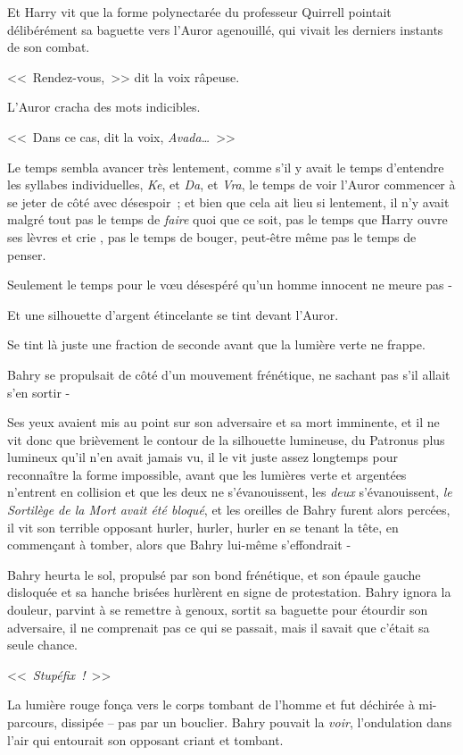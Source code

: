 Et Harry vit que la forme polynectarée du professeur Quirrell pointait délibérément sa baguette vers l'Auror agenouillé, qui vivait les derniers instants de son combat.

<<~Rendez-vous,~>> dit la voix râpeuse.

L'Auror cracha des mots indicibles.

<<~Dans ce cas, dit la voix, \emph{Avada…}~>>

Le temps sembla avancer très lentement, comme s'il y avait le temps d'entendre les syllabes individuelles, \emph{Ke}, et \emph{Da}, et \emph{Vra}, le temps de voir l'Auror commencer à se jeter de côté avec désespoir~; et bien que cela ait lieu si lentement, il n'y avait malgré tout pas le temps de \emph{faire} quoi que ce soit, pas le temps que Harry ouvre ses lèvres et crie , pas le temps de bouger, peut-être même pas le temps de penser.

Seulement le temps pour le vœu désespéré qu'un homme innocent ne meure pas -

Et une silhouette d'argent étincelante se tint devant l'Auror.

Se tint là juste une fraction de seconde avant que la lumière verte ne frappe.

\later

Bahry se propulsait de côté d'un mouvement frénétique, ne sachant pas s'il allait s'en sortir -

Ses yeux avaient mis au point sur son adversaire et sa mort imminente, et il ne vit donc que brièvement le contour de la silhouette lumineuse, du Patronus plus lumineux qu'il n'en avait jamais vu, il le vit juste assez longtemps pour reconnaître la forme impossible, avant que les lumières verte et argentées n'entrent en collision et que les deux ne s'évanouissent, les \emph{deux} s'évanouissent, \emph{le Sortilège de la Mort avait été bloqué}, et les oreilles de Bahry furent alors percées, il vit son terrible opposant hurler, hurler, hurler en se tenant la tête, en commençant à tomber, alors que Bahry lui-même s'effondrait -

Bahry heurta le sol, propulsé par son bond frénétique, et son épaule gauche disloquée et sa hanche brisées hurlèrent en signe de protestation. Bahry ignora la douleur, parvint à se remettre à genoux, sortit sa baguette pour étourdir son adversaire, il ne comprenait pas ce qui se passait, mais il savait que c'était sa seule chance.

<<~\emph{Stupéfix~!}~>>

La lumière rouge fonça vers le corps tombant de l'homme et fut déchirée à mi-parcours, dissipée -- pas par un bouclier. Bahry pouvait la \emph{voir}, l'ondulation dans l'air qui entourait son opposant criant et tombant.

